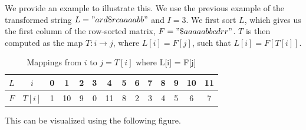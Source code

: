 \documentclass{article}
\begin{document}
We provide an example to illustrate this. We use the previous example of the transformed string \(L = "ard\$rcaaaabb"\) and \(I = 3\). 
We first sort \(L\), which gives us the first column of the row-sorted matrix, \(F="\$aaaaabbcdrr"\). \(T\) is then computed as the map \(T: i \rightarrow j\), where \(L[i] = F[j]\), such that \(L[i] = F[T[i]]\).
\begin{table}[H]
    \centering
    \begin{tabular}{|c|c|c|c|c|c|c|c|c|c|c|c|c|c|}
        \hline
        \(L\) & \(i\)       & 0 & 1  & 2 & 3 & 4  & 5 & 6 & 7 & 8 & 9 & 10 & 11  \\ \hline
        \(F\) & \(T[i]\)  & 1 & 10 & 9 & 0 & 11 & 8 & 2 & 3 & 4 & 5 & 6 & 7 \\ \hline
    \end{tabular}
    \caption{Mappings from \(i\) to \(j = T[i]\) where L[i] = F[j]}
    \label{tab:my_label}
\end{table}
This can be visualized using the following figure.
\end{document}
